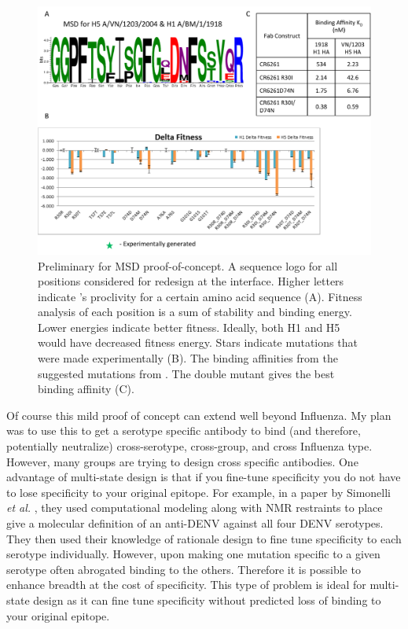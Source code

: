 \begin{figure}[!t]
   \centering
   \includegraphics[width=.9\textwidth]{images/chapter5/figure5_2.pdf}
   \caption[Preliminary for MSD Proof-of-Concept]{Preliminary for MSD proof-of-concept. A sequence logo for all positions considered for redesign at the interface. Higher letters indicate \rosetta's proclivity for a certain amino acid sequence (A). Fitness analysis of each position is a sum of stability and binding energy. Lower energies indicate better fitness. Ideally, both H1 and H5 would have decreased fitness energy. Stars indicate mutations that were made experimentally (B). The binding affinities from the suggested mutations from \rosetta. The double mutant gives the best binding affinity (C).}
       \label{fig:fig5_2}
\end{figure}

Of course this mild proof of concept can extend well beyond Influenza. My plan was to use this to get a serotype specific antibody to bind (and therefore, potentially neutralize) cross-serotype, cross-group, and cross Influenza type. However, many groups are trying to design cross specific antibodies. One advantage of multi-state design is that if you fine-tune specificity you do not have to lose specificity to your original epitope. For example, in a paper by Simonelli \textit{et al.} \citep{Simonelli:2013jc}, they used computational modeling along with NMR restraints to place give a molecular definition of an anti-DENV against all four DENV serotypes. They then used their knowledge of rationale design to fine tune specificity to each serotype individually. However, upon making one mutation specific to a given serotype often abrogated binding to the others. Therefore it is possible to enhance breadth at the cost of specificity. This type of problem is ideal for multi-state design as it can fine tune specificity without predicted loss of binding to your original epitope.

